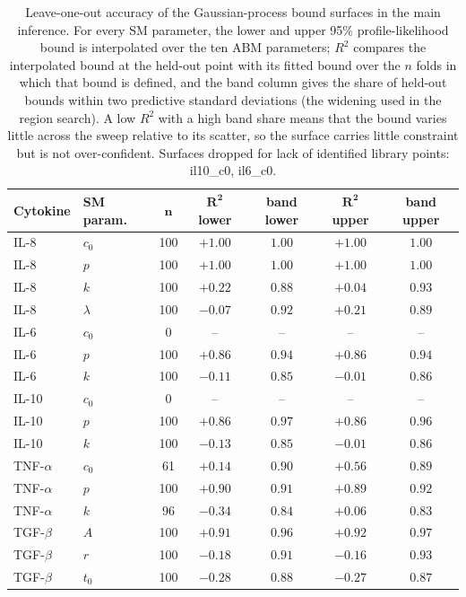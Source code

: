 \begin{table}[!htbp]
\caption{Leave-one-out accuracy of the Gaussian-process bound surfaces in the main inference. For every SM parameter, the lower and upper 95\% profile-likelihood bound is interpolated over the ten ABM parameters; $R^2$ compares the interpolated bound at the held-out point with its fitted bound over the $n$ folds in which that bound is defined, and the band column gives the share of held-out bounds within two predictive standard deviations (the widening used in the region search). A low $R^2$ with a high band share means that the bound varies little across the sweep relative to its scatter, so the surface carries little constraint but is not over-confident. Surfaces dropped for lack of identified library points: il10\_c0, il6\_c0.}
\label{tab:surfaces}
\centering\footnotesize
\begin{tabular}{llccccc}
\toprule
\textbf{Cytokine} & \textbf{SM param.} & $\mathbf{n}$ & $\mathbf{R^2}$ \textbf{lower} & \textbf{band lower} & $\mathbf{R^2}$ \textbf{upper} & \textbf{band upper} \\
\midrule
IL-8 & $c_0$ & 100 & $+1.00$ & $1.00$ & $+1.00$ & $1.00$ \\
IL-8 & $p$ & 100 & $+1.00$ & $1.00$ & $+1.00$ & $1.00$ \\
IL-8 & $k$ & 100 & $+0.22$ & $0.88$ & $+0.04$ & $0.93$ \\
IL-8 & $\lambda$ & 100 & $-0.07$ & $0.92$ & $+0.21$ & $0.89$ \\
IL-6 & $c_0$ & 0 & -- & -- & -- & -- \\
IL-6 & $p$ & 100 & $+0.86$ & $0.94$ & $+0.86$ & $0.94$ \\
IL-6 & $k$ & 100 & $-0.11$ & $0.85$ & $-0.01$ & $0.86$ \\
IL-10 & $c_0$ & 0 & -- & -- & -- & -- \\
IL-10 & $p$ & 100 & $+0.86$ & $0.97$ & $+0.86$ & $0.96$ \\
IL-10 & $k$ & 100 & $-0.13$ & $0.85$ & $-0.01$ & $0.86$ \\
TNF-$\alpha$ & $c_0$ & 61 & $+0.14$ & $0.90$ & $+0.56$ & $0.89$ \\
TNF-$\alpha$ & $p$ & 100 & $+0.90$ & $0.91$ & $+0.89$ & $0.92$ \\
TNF-$\alpha$ & $k$ & 96 & $-0.34$ & $0.84$ & $+0.06$ & $0.83$ \\
TGF-$\beta$ & $A$ & 100 & $+0.91$ & $0.96$ & $+0.92$ & $0.97$ \\
TGF-$\beta$ & $r$ & 100 & $-0.18$ & $0.91$ & $-0.16$ & $0.93$ \\
TGF-$\beta$ & $t_0$ & 100 & $-0.28$ & $0.88$ & $-0.27$ & $0.87$ \\
\bottomrule
\end{tabular}
\end{table}
